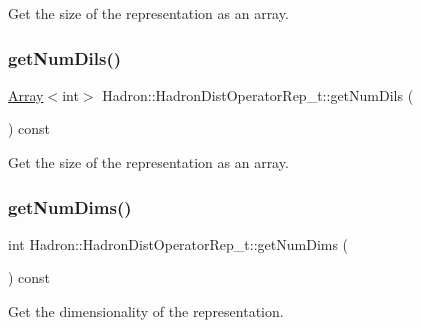 Get the size of the representation as an array. 

\mbox{\label{classHadron_1_1HadronDistOperatorRep__t_ae68199c0a94ee84df4223a1ea93787b3}} 
\subsubsection{\texorpdfstring{getNumDils()}{getNumDils()}\hspace{0.1cm}{\footnotesize\ttfamily [2/2]}}
{\footnotesize\ttfamily \mbox{\hyperlink{classXMLArray_1_1Array}{Array}}$<$int$>$ Hadron\+::\+Hadron\+Dist\+Operator\+Rep\+\_\+t\+::get\+Num\+Dils (\begin{DoxyParamCaption}{ }\end{DoxyParamCaption}) const}



Get the size of the representation as an array. 

\mbox{\label{classHadron_1_1HadronDistOperatorRep__t_a19ee3c70f7ac127fbc534b0f69304b37}} 
\subsubsection{\texorpdfstring{getNumDims()}{getNumDims()}\hspace{0.1cm}{\footnotesize\ttfamily [1/2]}}
{\footnotesize\ttfamily int Hadron\+::\+Hadron\+Dist\+Operator\+Rep\+\_\+t\+::get\+Num\+Dims (\begin{DoxyParamCaption}{ }\end{DoxyParamCaption}) const}



Get the dimensionality of the representation. 

